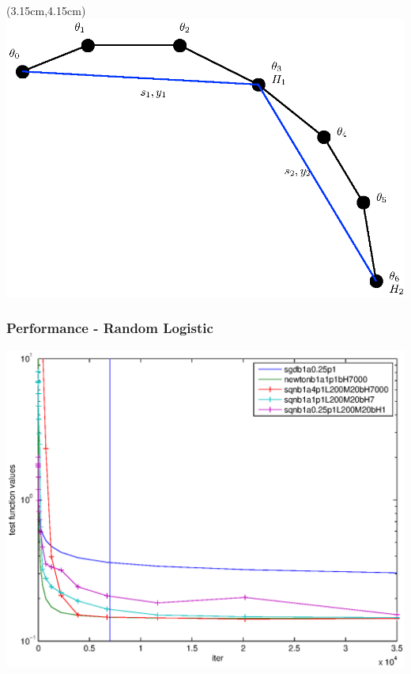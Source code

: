 \documentclass{beamer}
\begin{document}
							 \begin{frame}
\begin{textblock*}{0.2cm}(3.15cm,4.15cm) %
							 				\includegraphics[scale=0.5]{figures/1.eps}
\end{textblock*}
							 \end{frame}
							 
							 
\begin{frame}
	\frametitle{Performance - Random Logistic}
		\begin{center}
				\includegraphics[scale=0.4]{figures/P02.eps}
		\end{center}	
\end{frame}
\end{document}
